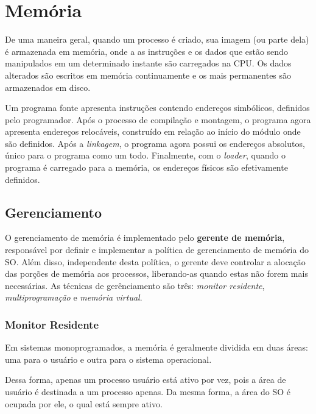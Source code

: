 \chapter{Memória}
De uma maneira geral, quando um processo é criado, sua imagem (ou parte dela) é armazenada em memória, onde a as instruções e os dados que estão sendo manipulados em um determinado instante são carregados na CPU. Os dados alterados são escritos em memória continuamente e os mais permanentes são armazenados em disco.

Um programa fonte apresenta instruções contendo endereços simbólicos, definidos pelo programador. Após o processo de compilação e montagem, o programa agora apresenta endereços relocáveis, construído em relação ao início do módulo onde são definidos. Após a \textit{linkagem}, o programa agora possui os endereços absolutos, único para o programa como um todo. Finalmente, com o \textit{loader}, quando o programa é carregado para a memória, os endereços físicos são efetivamente definidos. %

















\section{Gerenciamento}
O gerenciamento de memória é implementado pelo \textbf{gerente de memória}, responsável por definir e implementar a política de gerenciamento de memória do SO. Além disso, independente desta política, o gerente deve controlar a alocação das porções de memória aos processos, liberando-as quando estas não forem mais necessárias. As técnicas de gerênciamento são três: \textit{monitor residente}, \textit{multiprogramação} e \textit{memória virtual}.






\subsection{Monitor Residente}
Em sistemas monoprogramados, a memória é geralmente dividida em duas áreas: uma para o usuário e outra para o sistema operacional.

Dessa forma, apenas um processo usuário está ativo por vez, pois a área de usuário é destinada a um processo apenas. Da mesma forma, a área do SO é ocupada por ele, o qual está sempre ativo.

